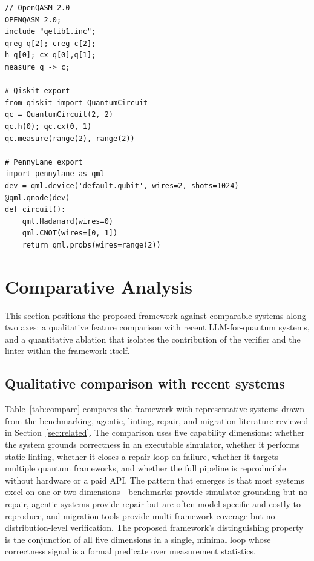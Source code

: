 \documentclass[11pt,a4paper]{article}
\begin{document}
\begin{lstlisting}[caption={Accepted Bell-state program (T01) and its exports.},label={lst:bell}]
// OpenQASM 2.0
OPENQASM 2.0;
include "qelib1.inc";
qreg q[2]; creg c[2];
h q[0]; cx q[0],q[1];
measure q -> c;

# Qiskit export
from qiskit import QuantumCircuit
qc = QuantumCircuit(2, 2)
qc.h(0); qc.cx(0, 1)
qc.measure(range(2), range(2))

# PennyLane export
import pennylane as qml
dev = qml.device('default.qubit', wires=2, shots=1024)
@qml.qnode(dev)
def circuit():
    qml.Hadamard(wires=0)
    qml.CNOT(wires=[0, 1])
    return qml.probs(wires=range(2))
\end{lstlisting}

\section{Comparative Analysis}
\label{sec:comparison}

This section positions the proposed framework against comparable systems along two axes: a qualitative feature comparison with recent LLM-for-quantum systems, and a quantitative ablation that isolates the contribution of the verifier and the linter within the framework itself.

\subsection{Qualitative comparison with recent systems}
Table~\ref{tab:compare} compares the framework with representative systems drawn from the benchmarking, agentic, linting, repair, and migration literature reviewed in Section~\ref{sec:related}. The comparison uses five capability dimensions: whether the system grounds correctness in an executable simulator, whether it performs static linting, whether it closes a repair loop on failure, whether it targets multiple quantum frameworks, and whether the full pipeline is reproducible without hardware or a paid API. The pattern that emerges is that most systems excel on one or two dimensions---benchmarks provide simulator grounding but no repair, agentic systems provide repair but are often model-specific and costly to reproduce, and migration tools provide multi-framework coverage but no distribution-level verification. The proposed framework's distinguishing property is the conjunction of all five dimensions in a single, minimal loop whose correctness signal is a formal predicate over measurement statistics.
\end{document}
